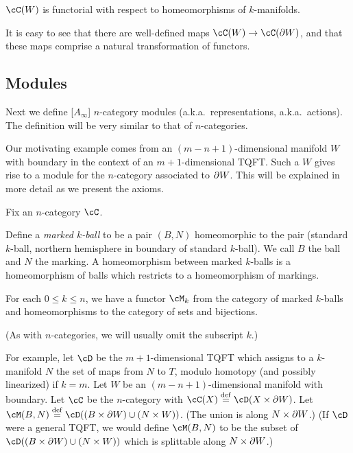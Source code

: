 $\cC(W)$ is functorial with respect to homeomorphisms of $k$-manifolds.

It is easy to see that
there are well-defined maps $\cC(W)\to\cC(\bd W)$, and that these maps
comprise a natural transformation of functors.




\subsection{Modules}

Next we define [$A_\infty$] $n$-category modules (a.k.a.\ representations,
a.k.a.\ actions).
The definition will be very similar to that of $n$-categories.

Our motivating example comes from an $(m{-}n{+}1)$-dimensional manifold $W$ with boundary
in the context of an $m{+}1$-dimensional TQFT.
Such a $W$ gives rise to a module for the $n$-category associated to $\partial W$.
This will be explained in more detail as we present the axioms.

Fix an $n$-category $\cC$.

Define a {\it marked $k$-ball} to be a pair $(B, N)$ homeomorphic to the pair
(standard $k$-ball, northern hemisphere in boundary of standard $k$-ball).
We call $B$ the ball and $N$ the marking.
A homeomorphism between marked $k$-balls is a homeomorphism of balls which
restricts to a homeomorphism of markings.

{For each $0 \le k \le n$, we have a functor $\cM_k$ from 
the category of marked $k$-balls and 
homeomorphisms to the category of sets and bijections.}

(As with $n$-categories, we will usually omit the subscript $k$.)

For example, let $\cD$ be the $m{+}1$-dimensional TQFT which assigns to a $k$-manifold $N$ the set 
of maps from $N$ to $T$, modulo homotopy (and possibly linearized) if $k=m$.
Let $W$ be an $(m{-}n{+}1)$-dimensional manifold with boundary.
Let $\cC$ be the $n$-category with $\cC(X) \deq \cD(X\times \bd W)$.
Let $\cM(B, N) \deq \cD((B\times \bd W)\cup (N\times W))$.
(The union is along $N\times \partial W$.)
(If $\cD$ were a general TQFT, we would define $\cM(B, N)$ to be
the subset of $\cD((B\times \bd W)\cup (N\times W))$ which is splittable along $N\times \partial W$.)

